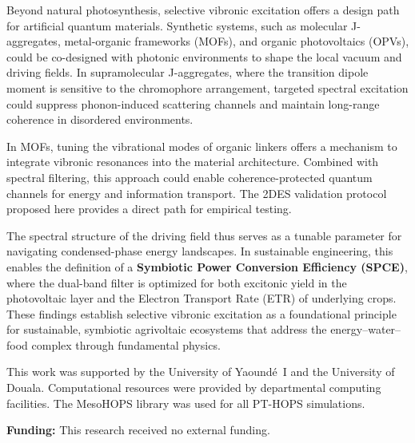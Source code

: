 \documentclass[journal=jpcl,manuscript=letter]{achemso}
\begin{document}
Beyond natural photosynthesis, selective vibronic excitation offers a design path for artificial quantum materials. Synthetic systems, such as molecular J-aggregates, metal-organic frameworks (MOFs), and organic photovoltaics (OPVs), could be co-designed with photonic environments to shape the local vacuum and driving fields. In supramolecular J-aggregates, where the transition dipole moment is sensitive to the chromophore arrangement, targeted spectral excitation could suppress phonon-induced scattering channels and maintain long-range coherence in disordered environments.

In MOFs, tuning the vibrational modes of organic linkers offers a mechanism to integrate vibronic resonances into the material architecture. Combined with spectral filtering, this approach could enable coherence-protected quantum channels for energy and information transport. The 2DES validation protocol proposed here provides a direct path for empirical testing.

The spectral structure of the driving field thus serves as a tunable parameter for navigating condensed-phase energy landscapes. In sustainable engineering, this enables the definition of a \textbf{Symbiotic Power Conversion Efficiency (SPCE)}, where the dual-band filter is optimized for both excitonic yield in the photovoltaic layer and the Electron Transport Rate (ETR) of underlying crops. These findings establish selective vibronic excitation as a foundational principle for sustainable, symbiotic agrivoltaic ecosystems that address the energy--water--food complex through fundamental physics.


\begin{acknowledgement}
This work was supported by the University of Yaoundé~I and the University of Douala. Computational resources were provided by departmental computing facilities. The MesoHOPS library was used for all PT-HOPS simulations.
\end{acknowledgement}

\vspace{1ex}
\noindent\textbf{Funding:} This research received no external funding.

\end{document}
